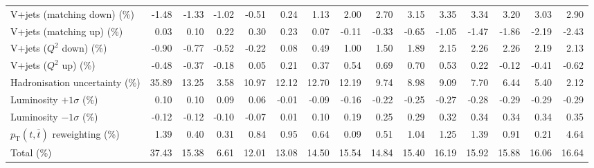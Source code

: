 \begin{table}[htbp]
{\begin{tabular}{lrrrrrrrrrrrrrr}
V+jets (matching down) (\%) & -1.48 & -1.33 & -1.02 & -0.51 & 0.24 & 1.13 & 2.00 & 2.70 & 3.15 & 3.35 & 3.34 & 3.20 & 3.03 & 2.90 \\ 
V+jets (matching up) (\%) & 0.03 & 0.10 & 0.22 & 0.30 & 0.23 & 0.07 & -0.11 & -0.33 & -0.65 & -1.05 & -1.47 & -1.86 & -2.19 & -2.43 \\ 
V+jets ($Q^{2}$ down) (\%) & -0.90 & -0.77 & -0.52 & -0.22 & 0.08 & 0.49 & 1.00 & 1.50 & 1.89 & 2.15 & 2.26 & 2.26 & 2.19 & 2.13 \\ 
V+jets ($Q^{2}$ up) (\%) & -0.48 & -0.37 & -0.18 & 0.05 & 0.21 & 0.37 & 0.54 & 0.69 & 0.70 & 0.53 & 0.22 & -0.12 & -0.41 & -0.62 \\ 
Hadronisation uncertainty (\%) & 35.89 & 13.25 & 3.58 & 10.97 & 12.12 & 12.70 & 12.19 & 9.74 & 8.98 & 9.09 & 7.70 & 6.44 & 5.40 & 2.12 \\ 
Luminosity $+1\sigma$ (\%) & 0.10 & 0.10 & 0.09 & 0.06 & -0.01 & -0.09 & -0.16 & -0.22 & -0.25 & -0.27 & -0.28 & -0.29 & -0.29 & -0.29 \\ 
Luminosity $-1\sigma$ (\%) & -0.12 & -0.12 & -0.10 & -0.07 & 0.01 & 0.10 & 0.19 & 0.25 & 0.29 & 0.32 & 0.34 & 0.34 & 0.34 & 0.35 \\ 
$p_\mathrm{T}(t,\bar{t})$ reweighting (\%) & 1.39 & 0.40 & 0.31 & 0.84 & 0.95 & 0.64 & 0.09 & 0.51 & 1.04 & 1.25 & 1.39 & 0.91 & 0.21 & 4.64 \\ 
\hline 
Total (\%) & 37.43  & 15.38  & 6.61  & 12.01  & 13.08  & 14.50  & 15.54  & 14.84  & 15.40  & 16.19  & 15.92  & 15.88  & 16.06  & 16.64 \\ 
\hline 
\end{tabular}
}
\end{table}
